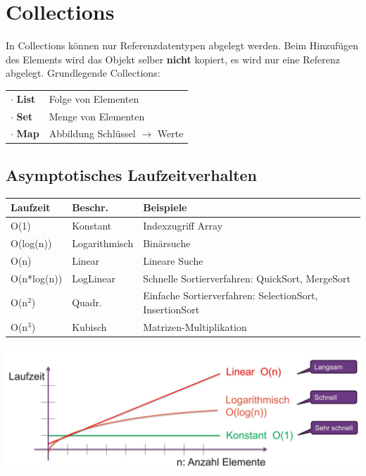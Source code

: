 \section{Collections}{\label{Collections}}
In Collections können nur Referenzdatentypen abgelegt werden. Beim Hinzufügen des Elements wird das Objekt selber \textbf{nicht} kopiert,
es wird nur eine Referenz abgelegt. Grundlegende Collections:
\begin{tabular}{l l}
    $\cdot$ \textbf{List} & Folge von Elementen \\
    $\cdot$ \textbf{Set}  & Menge von Elementen \\
    $\cdot$ \textbf{Map}  & Abbildung Schlüssel $\rightarrow$ Werte \\
\end{tabular}

\subsection{Asymptotisches Laufzeitverhalten}
\begin{tabularx}{\linewidth}{l l X} \hline
    \textbf{Laufzeit} & \textbf{Beschr.} & \textbf{Beispiele} \\ \hline
    O(1)        & Konstant      & Indexzugriff Array \\
    O(log(n))   & Logarithmisch & Binärsuche \\
    O(n)        & Linear        & Lineare Suche \\
    O(n*log(n)) & LogLinear     & Schnelle Sortierverfahren: QuickSort, MergeSort \\
    O(n$^2$)    & Quadr.        & Einfache Sortierverfahren: SelectionSort, InsertionSort \\
    O(n$^3$)    & Kubisch       & Matrizen-Multiplikation \\
\end{tabularx}

\includegraphics[width=\columnwidth]{pictures/laufzeit-collections.jpg}


